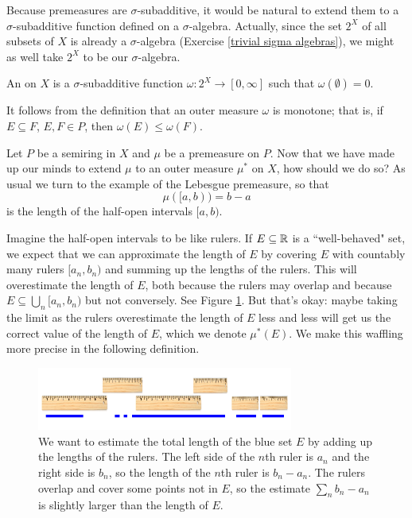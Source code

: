 \begin{subsec}
Because premeasures are $\sigma$-subadditive, it would be natural to extend them to a $\sigma$-subadditive function defined on a $\sigma$-algebra. Actually, since the set $2^{X}$ of all subsets of $X$ is already a $\sigma$-algebra (Exercise \ref{trivial sigma algebras}), we might as well take $2^{X}$ to be our $\sigma$-algebra.
\end{subsec}

\begin{definition}
An  on $X$ is a $\sigma$-subadditive function $\omega: 2^{X} \to [0, \infty]$ such that $\omega(\emptyset) = 0$.
\end{definition}

\begin{subsec}
It follows from the definition that an outer measure $\omega$ is monotone; that is, if $E \subseteq F$, $E,F \in P$, then $\omega(E) \leq \omega(F)$.
\end{subsec}

\begin{subsec}
Let $P$ be a semiring in $X$ and $\mu$ be a premeasure on $P$. Now that we have made up our minds to extend $\mu$ to an outer measure $\mu^{*}$ on $X$, how should we do so?
As usual we turn to the example of the Lebesgue premeasure, so that
$$\mu([a, b)) = b - a$$
is the length of the half-open intervals $[a, b)$.

Imagine the half-open intervals to be like rulers.
If $E \subseteq \mathbb{R}$ is a ``well-behaved" set, we expect that we can approximate the length of $E$ by covering $E$ with countably many rulers $[a_{n}, b_{n})$ and summing up the lengths of the rulers.
This will overestimate the length of $E$, both because the rulers may overlap and because $E \subseteq \bigcup_{n} [a_{n}, b_{n})$ but not conversely. See Figure \ref{rulers}.
But that's okay: maybe taking the limit as the rulers overestimate the length of $E$ less and less will get us the correct value of the length of $E$, which we denote $\mu^{*}(E)$.
We make this waffling more precise in the following definition.
\end{subsec}

\begin{figure}
\label{rulers}
\caption{We want to estimate the total length of the blue set $E$ by adding up the lengths of the rulers. The left side of the $n$th ruler is $a_{n}$ and the right side is $b_{n}$, so the length of the $n$th ruler is $b_{n} - a_{n}$. The rulers overlap and cover some points not in $E$, so the estimate $\sum_{n} b_{n} - a_{n}$ is slightly larger than the length of $E$.}
\centering \includegraphics[width=0.75\textwidth]{graphics/rulers}
\end{figure}

